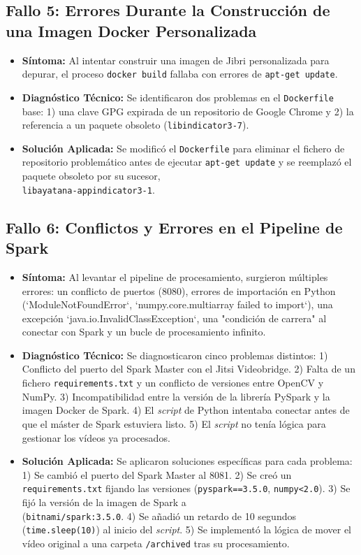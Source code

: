 \subsection{Fallo 5: Errores Durante la Construcción de una Imagen Docker Personalizada}
\begin{itemize}
    \item \textbf{Síntoma:} Al intentar construir una imagen de Jibri personalizada para depurar, el proceso \texttt{docker build} fallaba con errores de \texttt{apt-get update}.
    \item \textbf{Diagnóstico Técnico:} Se identificaron dos problemas en el \texttt{Dockerfile} base: 1) una clave GPG expirada de un repositorio de Google Chrome y 2) la referencia a un paquete obsoleto (\texttt{libindicator3-7}).
    \item \textbf{Solución Aplicada:} Se modificó el \texttt{Dockerfile} para eliminar el fichero de repositorio problemático antes de ejecutar \texttt{apt-get update} y se reemplazó el paquete obsoleto por su sucesor, \\ \texttt{libayatana-appindicator3-1}.
\end{itemize}

\subsection{Fallo 6: Conflictos y Errores en el Pipeline de Spark}
\begin{itemize}
    \item \textbf{Síntoma:} Al levantar el pipeline de procesamiento, surgieron múltiples errores: un conflicto de puertos (8080), errores de importación en Python (`ModuleNotFoundError`, `numpy.core.multiarray failed to import`), una excepción `java.io.InvalidClassException`, una "condición de carrera" al conectar con Spark y un bucle de procesamiento infinito.
    \item \textbf{Diagnóstico Técnico:} Se diagnosticaron cinco problemas distintos: 1) Conflicto del puerto del Spark Master con el Jitsi Videobridge. 2) Falta de un fichero \texttt{requirements.txt} y un conflicto de versiones entre OpenCV y NumPy. 3) Incompatibilidad entre la versión de la librería PySpark y la imagen Docker de Spark. 4) El \textit{script} de Python intentaba conectar antes de que el máster de Spark estuviera listo. 5) El \textit{script} no tenía lógica para gestionar los vídeos ya procesados.
    \item \textbf{Solución Aplicada:} Se aplicaron soluciones específicas para cada problema: 1) Se cambió el puerto del Spark Master al 8081. 2) Se creó un \texttt{requirements.txt} fijando las versiones (\texttt{pyspark==3.5.0}, \texttt{numpy<2.0}). 3) Se fijó la versión de la imagen de Spark a \\(\texttt{bitnami/spark:3.5.0}. 4) Se añadió un retardo de 10 segundos \\ (\texttt{time.sleep(10)}) al inicio del \textit{script}. 5) Se implementó la lógica de mover el vídeo original a una carpeta \texttt{/archived} tras su procesamiento.
\end{itemize}